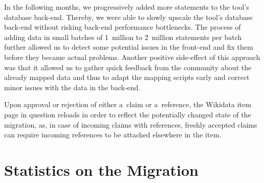 \documentclass{acm_proc_article-sp}
\begin{document}
In the following months, we progressively added more statements to the tool's database back-end.
Thereby, we were able to slowly upscale the tool's database back-end
without risking back-end performance bottlenecks.
The process of adding data in small batches of 1~million to 2~million statements per batch
further allowed us to detect some potential issues in the front-end
and fix them before they became actual problems.
Another positive side-effect of this approach was that it allowed us to gather quick feedback
from the community about the already mapped data and thus to adapt the mapping scripts early
and correct minor issues with the data in the back-end.

Upon approval or rejection of either a~claim or a~reference,
the Wikidata item page in question reloads in order to reflect
the potentially changed state of the migration, as,
in case of incoming claims with references, freshly accepted claims 
can require incoming references to be attached elsewhere in the item. 

\section{Statistics on the Migration}\label{sec:statistics-of-the-migration}
\end{document}
